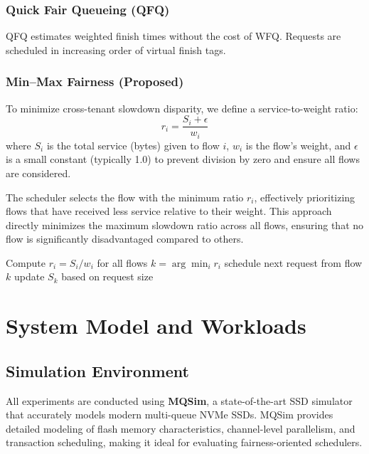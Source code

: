 \documentclass[11pt]{article}
\begin{document}
\subsubsection{Quick Fair Queueing (QFQ)}
QFQ estimates weighted finish times without the cost of WFQ.
Requests are scheduled in increasing order of virtual finish tags.

\subsubsection{Min--Max Fairness (Proposed)}
To minimize cross-tenant slowdown disparity, we define a service-to-weight ratio:
\[
r_i = \frac{S_i + \epsilon}{w_i}
\]
where $S_i$ is the total service (bytes) given to flow $i$, $w_i$ is the flow's weight, and $\epsilon$ is a small constant (typically 1.0) to prevent division by zero and ensure all flows are considered.

The scheduler selects the flow with the minimum ratio $r_i$, effectively prioritizing flows that have received less service relative to their weight. This approach directly minimizes the maximum slowdown ratio across all flows, ensuring that no flow is significantly disadvantaged compared to others.

\begin{algorithm}[h]
\caption{Min--Max Fairness Scheduler}
\begin{algorithmic}[1]
\State Compute $r_i = S_i / w_i$ for all flows
\State $k = \arg\min_i r_i$
\State schedule next request from flow $k$
\State update $S_k$ based on request size
\end{algorithmic}
\end{algorithm}

\section{System Model and Workloads}

\subsection{Simulation Environment}

All experiments are conducted using \textbf{MQSim}, a state-of-the-art SSD simulator that accurately models modern multi-queue NVMe SSDs. MQSim provides detailed modeling of flash memory characteristics, channel-level parallelism, and transaction scheduling, making it ideal for evaluating fairness-oriented schedulers.
\end{document}

